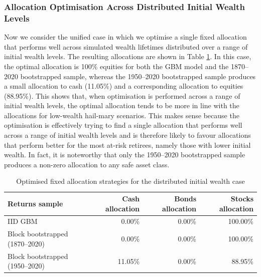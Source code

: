\documentclass[11pt]{article}
\begin{document}
\clearpage

\subsubsection{Allocation Optimisation Across Distributed Initial Wealth Levels}
\label{sec:fixed_allocation_dist_wealth}

Now we consider the unified case in which we optimise a single fixed allocation that performs well across simulated wealth lifetimes distributed over a range of initial wealth levels. The resulting allocations are shown in Table \ref{tab:optimised_fixed_allocation_strategies_distributed_initial_wealth}. In this case, the optimal allocation is 100\% equities for both the GBM model and the 1870--2020 bootstrapped sample, whereas the 1950--2020 bootstrapped sample produces a small allocation to cash (11.05\%) and a corresponding allocation to equities (88.95\%). This shows that, when optimisation is performed across a range of initial wealth levels, the optimal allocation tends to be more in line with the allocations for low-wealth hail-mary scenarios. This makes sense because the optimisation is effectively trying to find a single allocation that performs well across a range of initial wealth levels and is therefore likely to favour allocations that perform better for the most at-risk retirees, namely those with lower initial wealth. In fact, it is noteworthy that only the 1950--2020 bootstrapped sample produces a non-zero allocation to any safe asset class.


\begin{table}[h!]
\centering
\caption{Optimised fixed allocation strategies for the distributed initial wealth case}
\label{tab:optimised_fixed_allocation_strategies_distributed_initial_wealth}
\begin{tabular}{lrrr}
\toprule
Returns sample & Cash allocation & Bonds allocation & Stocks allocation \\
\midrule
IID GBM & 0.00\% & 0.00\% & 100.00\% \\
Block bootstrapped (1870--2020) & 0.00\% & 0.00\% & 100.00\% \\
Block bootstrapped (1950--2020) & 11.05\% & 0.00\% & 88.95\% \\
\bottomrule
\end{tabular}
\end{table}
\end{document}
